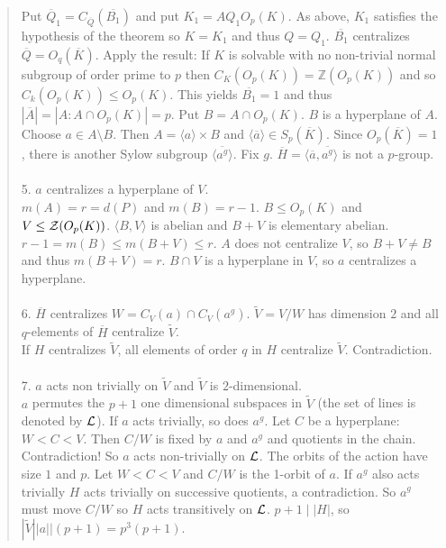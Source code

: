 \begin{quote}
Put ${\overline Q_1} = C_{\overline Q}({\overline {B_1}})$ and put $K_1= A Q_1 O_p(K)$.  As above, $K_1$ satisfies the hypothesis of the theorem
so $K = K_1$ and thus $Q= Q_1$.  ${\overline {B_1}}$ centralizes ${\overline Q} = O_q({\overline K})$. Apply the result: If $K$ is solvable
with no non-trivial normal subgroup of order prime to $p$ then $C_K(O_p(K)) = {\mathbb Z}(O_p(K))$ and so $C_k(O_p(K)) \leq O_p(K)$.  This
yields ${\overline {B_1}} = 1$ and thus $|{\overline A}| = |A:A \cap O_p(K)|= p$. Put $B = A \cap O_p(K)$.  $B$  is a hyperplane of $A$.
Choose $a \in A \setminus B$.  Then $A = \langle a \rangle \times B$ and
$\langle {\overline a} \rangle \in S_p({\overline K})$.
Since $O_p({\overline K})=1$, there is another Sylow subgroup $\langle {\overline {a^g}} \rangle$. Fix $g$.
${\overline H} = \langle {\overline a}, {\overline {a^g}} \rangle$ is not a $p$-group.
\\
\\
5. $a$ centralizes a hyperplane of $V$.\\
$m(A)=r=d(P)$ and $m(B)=r-1$.  $B \leq O_p(K)$ and $V \leq {\cal Z}(O_p(K))$.  $\langle B, V \rangle$ is abelian and
$B+V$ is elementary abelian.  $r-1 = m(B) \leq m(B+V) \leq r$.  $A$ does not centralize $V$, so $B+V \ne B$ and thus
$m(B+V)=r$.  $B \cap V$ is a hyperplane in $V$, so $a$ centralizes a hyperplane.
\\
\\
6. ${\overline H}$ centralizes $W = C_V(a) \cap C_V(a^g)$.  ${\tilde V} = V /W$ has dimension $2$ and all $q$-elements of
${\overline H}$ centralize ${\tilde V}$.\\
If $H$ centralizes ${\tilde V}$, all elements of order $q$ in $H$ centralize ${\tilde V}$.  Contradiction.
\\
\\
7. $a$ acts non trivially on ${\tilde V}$ and ${\tilde V}$ is $2$-dimensional.\\
$a$ permutes the $p+1$ one dimensional subspaces in ${\tilde V}$ (the set of lines is denoted by ${\cal L}$).
If $a$  acts trivially, so does $a^g$.  Let $C$ be a hyperplane: $W < C < V$.  Then $C/W$ is fixed by $a$ and $a^g$
and quotients in the chain.  Contradiction!  So $a$ acts non-trivially on ${\cal L}$.  The orbits of the action
have size $1$ and $p$.  Let $W < C < V$ and $C/W$ is the 1-orbit of $a$.  If $a^g$ also acts trivially $H$ acts
trivially on successive quotients, a contradiction.  So $a^g$ must move $C/W$ 
so $H$ acts transitively on ${\cal L}$.  $p+1 \mid |H|$, so
$|{\tilde V}| |a| |(p+1) = p^3 (p+1)$.

\end{quote}
